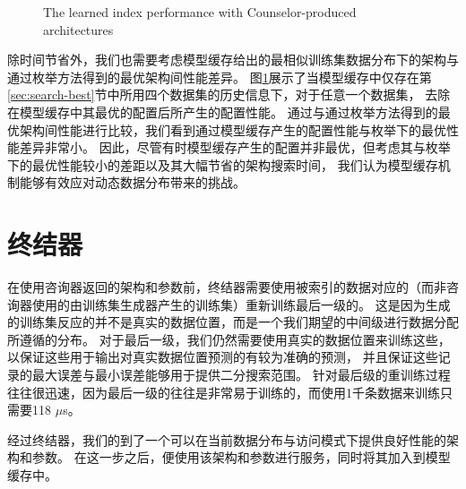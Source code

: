 \begin{figure}[!htp]
  \centering
    {The learned index performance with Counselor-produced architectures}
  \label{fig::counselor}
\end{figure}

除时间节省外，我们也需要考虑模型缓存给出的最相似训练集数据分布下的{\rmi}架构与通过枚举方法得到的最优{\rmi}架构间性能差异。
图\ref{fig::counselor}展示了当模型缓存中仅存在第\ref{sec:search-best}节中所用四个数据集的历史信息下，对于任意一个数据集，
去除在模型缓存中其最优的{\rmi}配置后所产生的配置性能。
通过与通过枚举方法得到的最优{\rmi}架构间性能进行比较，我们看到通过模型缓存产生的{\rmi}配置性能与枚举下的最优性能差异非常小。
因此，尽管有时模型缓存产生的{\rmi}配置并非最优，但考虑其与枚举下的最优性能较小的差距以及其大幅节省的架构搜索时间，
我们认为模型缓存机制能够有效应对动态数据分布带来的挑战。

\section{终结器}

在使用咨询器返回的{\rmi}架构和参数前，终结器需要使用被索引的数据对应的{\cdf}（而非咨询器使用的由训练集生成器产生的训练集）重新训练{\rmi}最后一级的{\model}。
这是因为生成的训练集反应的并不是真实的数据位置，而是一个我们期望的中间级{\model}进行数据分配所遵循的分布。
对于{\rmi}最后一级{\model}，我们仍然需要使用真实的数据位置来训练这些{\model}，以保证这些用于输出对真实数据位置预测的{\model}有较为准确的预测，
并且保证这些{\model}记录的最大误差与最小误差能够用于提供二分搜索范围。
针对{\rmi}最后级{\model}的重训练过程往往很迅速，因为最后一级的往往是非常易于训练的{\lr}，而使用1千条数据来训练{\lr}只需要118 $\mu$s。

经过终结器，我们的到了一个可以在当前数据分布与访问模式下提供良好性能的{\li}架构和参数。
在这一步之后，{\sys}便使用该{\li}架构和参数进行服务，同时将其加入到模型缓存中。


